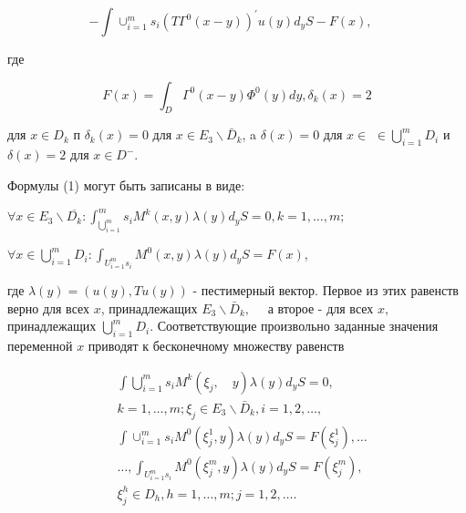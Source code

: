 \documentclass[10pt]{article}
\begin{document}
\[

-\int \cup_{i=1}^{m} s_{i}\left(T \Gamma^{0}(x-y)\right)^{\prime} u(y) d_{y} S-F(x), \quad

\]



где



\[

F(x)=\int_{D} \Gamma^{0}(x-y) \Phi^{0}(y) d y, \delta_{k}(x)=2

\]



для $x \in D_{k}$ п $\delta_{k}(x)=0$ для $x \in E_{3} \backslash \bar{D}_{k}$, a $\delta(x)=0$ для $x \in$ $\in \bigcup_{i=1}^{m} D_{i}$ и $\delta(x)=2$ для $x \in D^{-}$.



Формулы (1) могут быть записаны в виде:



$\forall x \in E_{3} \backslash \overline{D_{k}}: \int_{\bigcup_{i=1}^{m}}^{m} s_{i} M^{k}(x, y) \lambda(y) d_{y} S=0, k=1, \ldots, m ;$



$\forall x \in \bigcup_{i=1}^{m} D_{i}: \int_{U_{i=1}^{m} s_{i}} M^{0}(x, y) \lambda(y) d_{y} S=F(x)$,



где $\lambda(y)=(u(y), T u(y))$ - пестимерный вектор. Первое из этих равенств верно для всех $x$, принадлежащих $E_{3} \backslash \bar{D}_{k}, \quad$ а второе - для всех $x, \quad$ принадлежащих $\bigcup_{i=1}^{m} D_{i}$. Соответствующие произвольно заданные значения переменной $x$ приводят к бесконечному множеству равенств



\[

\begin{aligned}

& \int \bigcup_{i=1}^{m} s_{i} M^{k}\left(\xi_{j}, \quad y\right) \lambda(y) d_{y} S=0, \\

& k=1, \ldots, m ; \xi_{j} \in E_{3} \backslash \bar{D}_{k}, i=1,2, \ldots, \\

& \int \cup_{i=1}^{m} s_{i} M^{0}\left(\xi_{j}^{1}, y\right) \lambda(y) d_{y} S=F\left(\xi_{j}^{1}\right), \ldots \\

& \ldots, \int_{U_{i=1}^{m} s_{i}} M^{0}\left(\xi_{j}^{m}, y\right) \lambda(y) d_{y} S=F\left(\xi_{j}^{m}\right) \text {, } \\

& \xi_{j}^{h} \in D_{h}, h=1, \ldots, m ; j=1,2, \ldots .

\end{aligned}

\]
\end{document}
